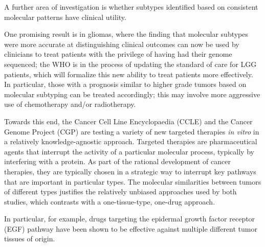         A further area of investigation is whether subtypes identified
        based on consistent molecular patterns have clinical utility.

        
        One promising result is in gliomas, where the finding that molecular subtypes were more
        accurate at distinguishing clinical outcomes can now be used by
        clinicians to treat patients with the privilege of having had
        their genome sequenced; the WHO is in the process of updating
        the standard of care for LGG patients, which will formalize
        this new ability to treat patients more effectively. In
        particular, those with a prognosis similar to higher grade
      tumors based on molecular subtyping can be treated
        accordingly; this may involve more aggressive use of
        chemotherapy and/or radiotherapy.

        Towards this end, the Cancer Cell Line
        Encyclopaedia (CCLE)\cite{barretina_cancer_2012} and the Cancer
        Genome Project (CGP) \cite{ledford_end_2015} are testing a variety
        of new targeted therapies \textit{in vitro} in a relatively knowledge-agnostic
        approach. Targeted therapies are pharmaceutical agents that
        interrupt the activity of a particular molecular process,
        typically by interfering with a protein. As part of the
        rational development of cancer therapies, they are typically
        chosen in a strategic way to interrupt key pathways that are
        important in particular types. The molecular similarities
        between tumors of different types justifies the relatively
        unbiased approaches used by both studies, which contrasts with
        a one-tissue-type, one-drug approach.
        
        In particular, for  example, drugs targeting the epidermal growth factor receptor
        (EGF) pathway have been shown to be effective against multiple
        different tumor tissues of origin.


        